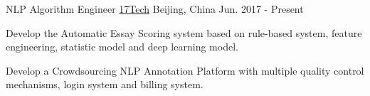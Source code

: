 

\begin{cventries}

  \cventry
    {NLP Algorithm Engineer} %
    {\href{https://www.17zuoye.com/help/aboutus.vpage}{17Tech}} %
    {Beijing, China} %
    {Jun. 2017 - Present} %
    {
      \begin{cvitems} %
        \item {Develop the Automatic Essay Scoring system based on rule-based system, feature engineering, statistic model and deep learning model.}
        \item {Develop a Crowdsourcing NLP Annotation Platform with multiple quality control mechanisms, login system and billing system.}
      \end{cvitems}
    }



\end{cventries}
